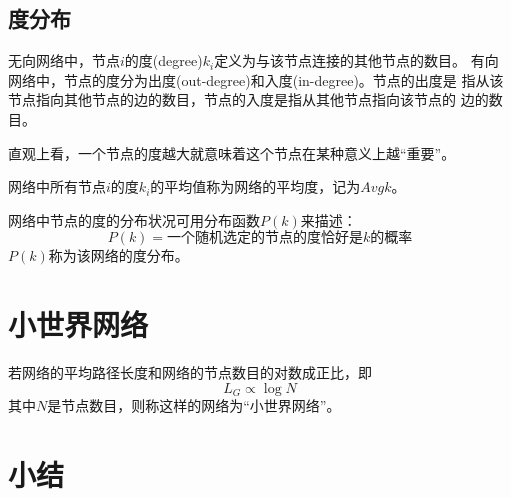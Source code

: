 \documentclass[master]{njuthesis}
\begin{document}
\subsection{度分布}

\begin{definition}[度]
无向网络中，节点$i$的度(degree)$k_i$定义为与该节点连接的其他节点的数目。
有向网络中，节点的度分为出度(out-degree)和入度(in-degree)。节点的出度是
指从该节点指向其他节点的边的数目，节点的入度是指从其他节点指向该节点的
边的数目。
\end{definition}

直观上看，一个节点的度越大就意味着这个节点在某种意义上越“重要”。

\begin{definition}[平均度]
网络中所有节点$i$的度$k_i$的平均值称为网络的平均度，记为$Avg{k}$。
\end{definition}

\begin{definition}[度分布]
网络中节点的度的分布状况可用分布函数$P(k)$来描述：
\begin{equation}\label{eq:degree_distribution}
    P(k) = \text{一个随机选定的节点的度恰好是$k$的概率}
\end{equation}
$P(k)$称为该网络的度分布。
\end{definition}

\section{小世界网络}

\begin{definition}[小世界网络]
若网络的平均路径长度和网络的节点数目的对数成正比，即
\[
  L_{G} \propto \log N
\]
其中$N$是节点数目，则称这样的网络为``小世界网络''。
\end{definition}



\section{小结}








\end{document}
